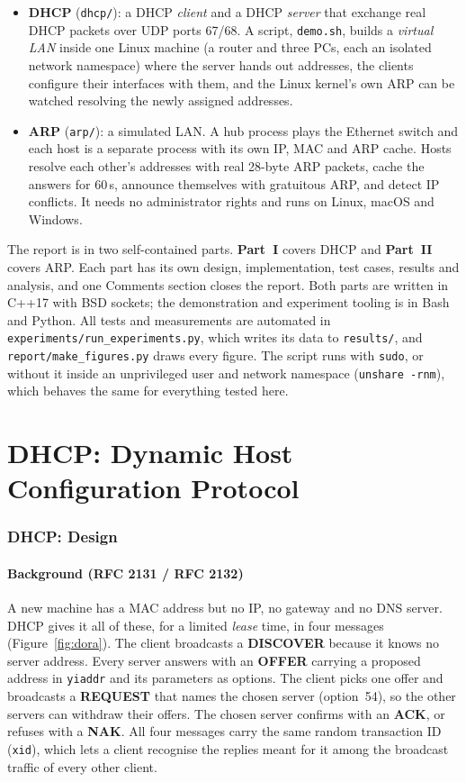\documentclass[11pt]{article}
\begin{document}
\begin{itemize}[leftmargin=1.6em]
  \item \textbf{DHCP} (\texttt{dhcp/}): a DHCP \emph{client} and a DHCP \emph{server}
  that exchange real DHCP packets over UDP ports 67/68. A script, \texttt{demo.sh}, builds
  a \emph{virtual LAN} inside one Linux machine (a router and three PCs, each an isolated
  network namespace) where the server hands out addresses, the clients configure their
  interfaces with them, and the Linux kernel's own ARP can be watched resolving the newly
  assigned addresses.
  \item \textbf{ARP} (\texttt{arp/}): a simulated LAN. A hub process plays the Ethernet
  switch and each host is a separate process with its own IP, MAC and ARP cache. Hosts
  resolve each other's addresses with real 28-byte ARP packets, cache the answers for
  60\,s, announce themselves with gratuitous ARP, and detect IP conflicts. It needs no
  administrator rights and runs on Linux, macOS and Windows.
\end{itemize}

The report is in two self-contained parts. \textbf{Part~I} covers DHCP and
\textbf{Part~II} covers ARP. Each part has its own design, implementation, test cases,
results and analysis, and one Comments section closes the report. Both parts are written in
C++17 with BSD sockets; the demonstration and experiment tooling is in Bash and Python.
All tests and measurements are automated in \texttt{experiments/run\_experiments.py},
which writes its data to \texttt{results/}, and \texttt{report/make\_figures.py} draws
every figure. The script runs with \texttt{sudo}, or without it inside an unprivileged
user and network namespace (\texttt{unshare -rnm}), which behaves the same for everything
tested here.


\part{DHCP: Dynamic Host Configuration Protocol}

\section{DHCP: Design}

\subsection{Background (RFC 2131 / RFC 2132)}
A new machine has a MAC address but no IP, no gateway and no DNS server. DHCP gives it all
of these, for a limited \emph{lease} time, in four messages (Figure~\ref{fig:dora}). The
client broadcasts a \textbf{DISCOVER} because it knows no server address. Every server
answers with an \textbf{OFFER} carrying a proposed address in \texttt{yiaddr} and its
parameters as options. The client picks one offer and broadcasts a \textbf{REQUEST} that
names the chosen server (option~54), so the other servers can withdraw their offers. The
chosen server confirms with an \textbf{ACK}, or refuses with a \textbf{NAK}. All four
messages carry the same random transaction ID (\texttt{xid}), which lets a client
recognise the replies meant for it among the broadcast traffic of every other client.
\end{document}
